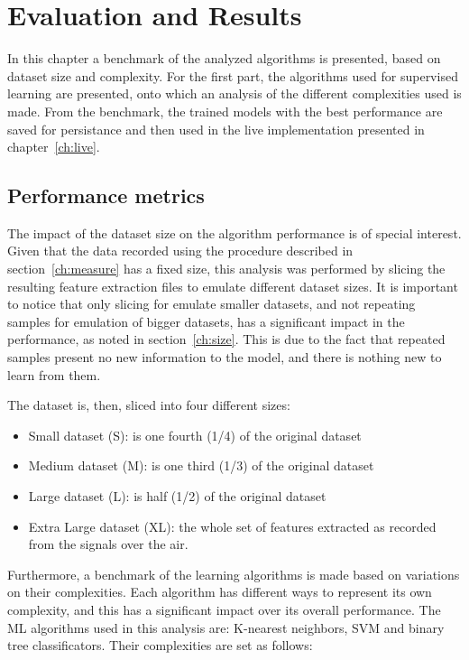 \acresetall
\chapter{Evaluation and Results}\label{ch:evaluation}
In this chapter a benchmark of the analyzed algorithms is presented, based on dataset size and complexity. For the first part, the algorithms used for supervised learning are presented, onto which an analysis of the different complexities used is made. From the benchmark, the trained models with the best performance are saved for persistance and then used in the live implementation presented in chapter~\ref{ch:live}.

\section{Performance metrics}\label{ch:performance}

The impact of the dataset size on the algorithm performance is of special interest. Given that the data recorded using the procedure described in section~\ref{ch:measure} has a fixed size, this analysis was performed by slicing the resulting feature extraction files to emulate different dataset sizes. It is important to notice that only slicing for emulate smaller datasets, and not repeating samples for emulation of bigger datasets, has a significant impact in the performance, as noted in section~\ref{ch:size}. This is due to the fact that repeated samples present no new information to the model, and there is nothing new to learn from them.

The dataset is, then, sliced into four different sizes:

\begin{itemize}
    \item Small dataset (S): is one fourth (1/4) of the original dataset
    \item Medium dataset (M): is one third (1/3) of the original dataset
    \item Large dataset (L): is half (1/2) of the original dataset
    \item Extra Large dataset (XL): the whole set of features extracted as recorded from the signals over the air.
\end{itemize}

Furthermore, a benchmark of the learning algorithms is made based on variations on their complexities. Each algorithm has different ways to represent its own complexity, and this has a significant impact over its overall performance. The \ac{ML} algorithms used in this analysis are: K-nearest neighbors, \ac{SVM} and binary tree classificators. Their complexities are set as follows:

